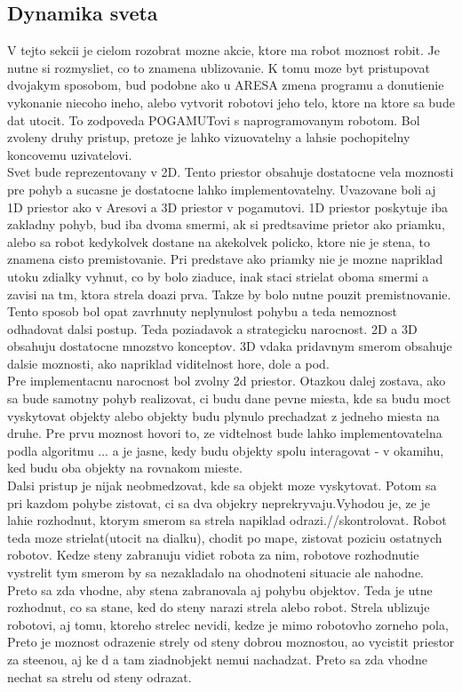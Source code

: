 \documentclass[a4paper,11pt,final]{report}
\begin{document}
\subsection{Dynamika sveta}
V tejto sekcii je cielom rozobrat mozne akcie, ktore ma robot moznost robit. Je nutne si rozmysliet, co to znamena ublizovanie. K tomu moze byt pristupovat dvojakym sposobom, bud podobne ako u ARESA zmena programu a donutienie vykonanie niecoho ineho, alebo vytvorit robotovi jeho telo, ktore na ktore sa bude dat utocit. To zodpoveda POGAMUTovi s naprogramovanym robotom. Bol zvoleny druhy pristup, pretoze je lahko vizuovatelny a lahsie pochopitelny koncovemu uzivatelovi.\\%
Svet bude reprezentovany v 2D. Tento priestor obsahuje  dostatocne vela moznosti pre pohyb a sucasne je dostatocne lahko implementovatelny. Uvazovane boli aj 1D priestor ako v Aresovi a 3D priestor v pogamutovi. 1D priestor poskytuje iba zakladny pohyb, bud iba dvoma smermi, ak si predtsavime prietor ako priamku, alebo sa robot kedykolvek dostane na akekolvek policko, ktore nie je stena, to znamena cisto premistovanie. Pri predstave ako priamky nie je mozne napriklad utoku zdialky vyhnut, co by bolo ziaduce, inak staci strielat oboma smermi a zavisi na tm, ktora strela doazi prva. Takze by bolo nutne pouzit premistnovanie. Tento sposob bol opat zavrhnuty neplynulost pohybu a teda nemoznost odhadovat dalsi postup. Teda poziadavok a strategicku narocnost. 2D a 3D obsahuju dostatocne mnozstvo konceptov. 3D vdaka pridavnym smerom obsahuje dalsie moznosti, ako napriklad viditelnost hore, dole a pod. \\
Pre implementacnu narocnost bol zvolny 2d priestor. Otazkou dalej zostava, ako sa bude samotny pohyb realizovat, ci budu dane pevne miesta, kde sa budu moct vyskytovat objekty alebo objekty budu plynulo prechadzat z jedneho miesta na druhe. Pre prvu moznost hovori to, ze vidtelnost bude lahko implementovatelna podla algoritmu ... a je jasne, kedy budu objekty spolu interagovat - v okamihu, ked budu oba objekty na rovnakom mieste. \\
Dalsi pristup je nijak neobmedzovat, kde sa objekt moze vyskytovat. Potom sa pri kazdom pohybe zistovat, ci sa dva objekry neprekryvaju.Vyhodou je, ze je lahie rozhodnut, ktorym smerom sa strela napiklad odrazi.//skontrolovat.
Robot teda moze strielat(utocit na dialku), chodit po mape, zistovat poziciu ostatnych robotov. Kedze steny zabranuju vidiet robota za nim, robotove rozhodnutie vystrelit tym smerom by sa nezakladalo na ohodnoteni situacie ale nahodne. Preto sa zda vhodne, aby stena zabranovala aj pohybu objektov. Teda je utne rozhodnut, co sa stane, ked do steny narazi strela alebo robot. Strela ublizuje robotovi, aj tomu, ktoreho strelec nevidi, kedze je mimo robotovho zorneho pola, Preto je moznost odrazenie strely od steny dobrou moznostou, ao vycistit priestor za steenou, aj ke d a tam ziadnobjekt nemui nachadzat. Preto sa zda vhodne nechat sa strelu od steny odrazat.\\
\end{document}

